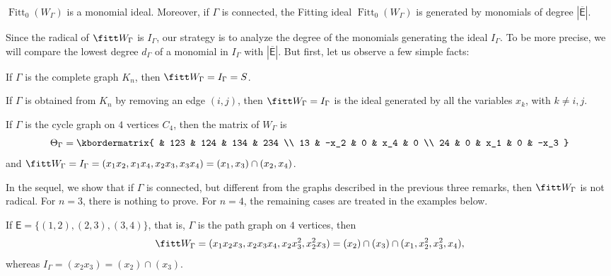 \documentclass[10pt, leqno]{amsart}
\begin{document}
\begin{rem} \label{rem_fitt_monomial}
$\operatorname{Fitt}_0(W_\Gamma)$ is a monomial ideal. Moreover, if $\Gamma$ is connected, the Fitting ideal $\operatorname{Fitt}_0(W_\Gamma)$ is generated by monomials of degree $| \overline{\mathsf{E}} |$.
\end{rem}

Since the radical of $\fitt W_\Gamma$ is $I_\Gamma$, our strategy is to analyze the degree of the monomials generating the ideal $I_\Gamma$. To be more precise, we will compare the lowest degree $d_\Gamma$ of a monomial in $I_\Gamma$ with $| \overline{\mathsf{E}} |$. But first, let us observe a few simple facts:

\begin{rem} \label{obs_kn}
If $\Gamma$ is the complete graph $K_n$, then $\fitt W_\Gamma = I_\Gamma = S$.
\end{rem}

\begin{rem} \label{obs_kn_fara_una}
If $\Gamma$ is obtained from $K_n$ by removing an edge $(i,j)$, then $\fitt W_\Gamma = I_\Gamma$ is the ideal generated by all the variables $x_k$, with  $k\neq i,j$.
\end{rem}

\begin{rem} \label{obs_c4}
If $\Gamma$ is the cycle graph on $4$ vertices $C_4$, then the matrix of $W_\Gamma$ is
\[
\Theta_\Gamma = \kbordermatrix{
    & 123 & 124 & 134 & 234 \\
    13 & -x_2 & 0 & x_4 & 0 \\
    24 & 0 & x_1 & 0 & -x_3
  }
\]
and $\fitt W_\Gamma = I_\Gamma = (x_1x_2,x_1x_4,x_2x_3,x_3x_4) = (x_1,x_3) \cap (x_2,x_4)$. 
\end{rem}

In the sequel, we show that if $\Gamma$ is connected, but different from the graphs described in the previous three remarks, then $\fitt W_\Gamma$ is not radical. For $n = 3$, there is nothing to prove. For $n = 4$, the remaining cases are treated in the examples below.

\begin{exmp} \label{ex:n = 4_tree1}
If $\mathsf{E} = \{(1,2), (2,3), (3,4)\}$, that is, $\Gamma$ is the path graph on $4$ vertices, then 
\[
\fitt W_\Gamma = (x_1x_2x_3, x_2x_3x_4, x_2x_3^2, x_2^2x_3) = (x_2) \cap (x_3) \cap (x_1, x_2^2, x_3^2, x_4),
\]
whereas $I_\Gamma = (x_2 x_3) = (x_2) \cap (x_3)$.
\end{exmp}
\end{document}
